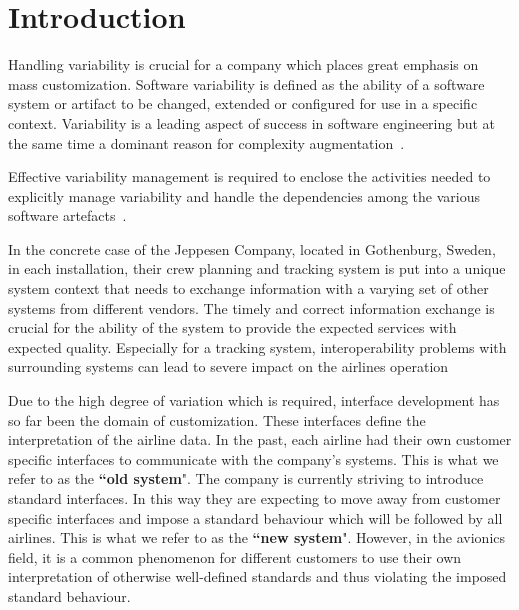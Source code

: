 \section{Introduction}

Handling variability is crucial for a company which places great emphasis on mass customization. 
Software variability is defined as the ability of a software system or artifact to be changed, extended or configured for use in a specific context. 
Variability is a leading aspect of success in software engineering but at the same time a dominant reason for complexity augmentation~\cite{vonRhein2016}. %




Effective variability management is required to enclose the activities needed to explicitly manage variability and handle the dependencies among the various software artefacts~\cite{Schmid2004}. %


In the concrete case of the Jeppesen Company, located in Gothenburg, Sweden, in each installation, their crew planning
and tracking system is put into a unique system context that needs to exchange information
with a varying set of other systems from different vendors. The timely and correct
information exchange is crucial for the ability of the system to provide the expected services
with expected quality. Especially for a tracking system, interoperability problems
with surrounding systems can lead to severe impact on the airlines operation

Due to the high degree of variation which is required, interface development has so far been the domain of customization. 
These interfaces define the interpretation of the airline data. In the past, each airline had their own customer specific interfaces to communicate with the company's systems. This is what we refer to as the {\bf ``old system}". The company is currently striving to introduce standard interfaces. In this way they are expecting to move away from customer specific interfaces and impose a standard behaviour which will be followed by all airlines. This is what we refer to as the {\bf ``new system}". However, in the avionics field, it is a common phenomenon for different customers to use their own interpretation of otherwise well-defined standards and thus violating the imposed standard behaviour. 

